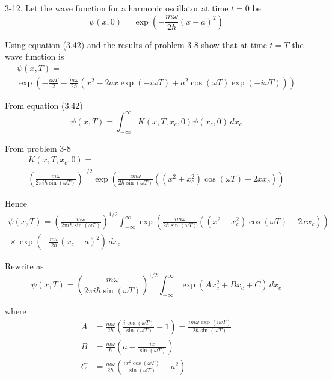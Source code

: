\documentclass[12pt]{article}
\begin{document}
3-12.
Let the wave function for a harmonic oscillator at time $t=0$ be
\begin{equation*}
\psi(x,0)=\exp\left(-\frac{m\omega}{2\hbar}(x-a)^2\right)
\end{equation*}

Using equation (3.42) and the results of problem 3-8 show that
at time $t=T$ the wave function is
\begin{multline*}
\psi(x,T)=
\\
\exp\left(
-\frac{i\omega T}{2}-\frac{m\omega}{2\hbar}
\left(x^2-2ax\exp(-i\omega T)+a^2\cos(\omega T)\exp(-i\omega T)\right)
\right)
\end{multline*}

From equation (3.42)
\begin{equation*}
\psi(x,T)=\int_{-\infty}^\infty K(x,T,x_c,0)\psi(x_c,0)\,dx_c
\end{equation*}

From problem 3-8
\begin{multline*}
K(x,T,x_c,0)=
\\
\left(\frac{m\omega}{2\pi i\hbar\sin(\omega T)}\right)^{1/2}
\exp\left(
\frac{im\omega}{2\hbar\sin(\omega T)}\left((x^2+x_c^2)\cos(\omega T)-2xx_c\right)
\right)
\end{multline*}

Hence
\begin{multline*}
\psi(x,T)=\left(\frac{m\omega}{2\pi i\hbar\sin(\omega T)}\right)^{1/2}
\int_{-\infty}^\infty \exp\left(
\frac{im\omega}{2\hbar\sin(\omega T)}\left((x^2+x_c^2)\cos(\omega T)-2xx_c\right)
\right)
\\
{}\times\exp\left(-\frac{m\omega}{2\hbar}(x_c-a)^2\right)\,dx_c
\end{multline*}

Rewrite as
\begin{equation*}
\psi(x,T)=\left(\frac{m\omega}{2\pi i\hbar\sin(\omega T)}\right)^{1/2}
\int_{-\infty}^\infty\exp(Ax_c^2+Bx_c+C)\,dx_c
\tag{1}
\end{equation*}

where
\begin{align*}
A&=\frac{m\omega}{2\hbar}\left(\frac{i\cos(\omega T)}{\sin(\omega T)}-1\right)
=\frac{im\omega\exp(i\omega T)}{2\hbar\sin(\omega T)}
\\
B&=\frac{m\omega}{\hbar}\left(a-\frac{ix}{\sin(\omega T)}\right)
\\
C&=\frac{m\omega}{2\hbar}\left(\frac{ix^2\cos(\omega T)}{\sin(\omega T)}-a^2\right)
\end{align*}
\end{document}
